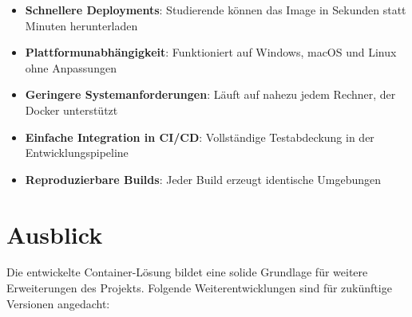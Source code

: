 \documentclass{article}
\begin{document}
\begin{itemize}
  \item \textbf{Schnellere Deployments}: Studierende können das Image in Sekunden statt Minuten herunterladen
  \item \textbf{Plattformunabhängigkeit}: Funktioniert auf Windows, macOS und Linux ohne Anpassungen
  \item \textbf{Geringere Systemanforderungen}: Läuft auf nahezu jedem Rechner, der Docker unterstützt
  \item \textbf{Einfache Integration in CI/CD}: Vollständige Testabdeckung in der Entwicklungspipeline
  \item \textbf{Reproduzierbare Builds}: Jeder Build erzeugt identische Umgebungen
\end{itemize}

\newpage

\section{Ausblick}
Die entwickelte Container-Lösung bildet eine solide Grundlage für weitere Erweiterungen des Projekts. Folgende Weiterentwicklungen sind für zukünftige Versionen angedacht:
\end{document}
